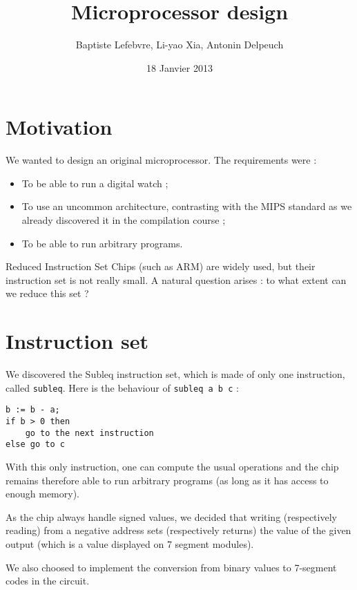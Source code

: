 \documentclass[a4paper]{article}
\begin{document}
\title{Microprocessor design}
\author{Baptiste Lefebvre, Li-yao Xia, Antonin Delpeuch}
\date{18 Janvier 2013}

\maketitle

\section{Motivation}

We wanted to design an original microprocessor. The requirements were :
\begin{itemize}
\item To be able to run a digital watch ;
\item To use an uncommon architecture, contrasting with the MIPS standard as we
already discovered it in the compilation course ;
\item To be able to run arbitrary programs.
\end{itemize}

Reduced Instruction Set Chips (such as ARM) are widely used, but their instruction set
is not really small. A natural question arises : to what extent can we
reduce this set ? 

\section{Instruction set}

We discovered the Subleq instruction set, which is made of only one
instruction, called \texttt{subleq}. Here is the behaviour of
\texttt{subleq a b c} :

\centering
\begin{verbatim}
b := b - a;
if b > 0 then
    go to the next instruction
else go to c
\end{verbatim}

With this only instruction, one can compute the usual operations
and the chip remains therefore able to run arbitrary programs
(as long as it has access to enough memory).

As the chip always handle signed values, we decided that writing
(respectively 
reading) from a negative address sets (respectively returns) the value of
the given output (which is a value displayed on 7 segment modules).

We also choosed to implement the conversion from binary values
to 7-segment codes in the circuit. 
\end{document}
